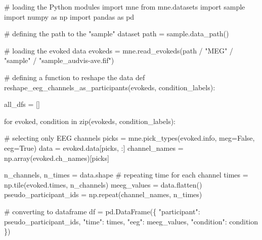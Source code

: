 \documentclass[
  man,
  floatsintext,
  longtable,
  a4paper,
  nolmodern,
  notxfonts,
  notimes,
  colorlinks=true,linkcolor=blue,citecolor=blue,urlcolor=blue]{apa7}
\newenvironment{Shaded}{\begin{snugshade}}{\end{snugshade}}
\newcommand{\BuiltInTok}[1]{\textcolor[rgb]{0.00,0.23,0.31}{#1}}
\newcommand{\CommentTok}[1]{\textcolor[rgb]{0.37,0.37,0.37}{#1}}
\newcommand{\ControlFlowTok}[1]{\textcolor[rgb]{0.00,0.23,0.31}{#1}}
\newcommand{\ImportTok}[1]{\textcolor[rgb]{0.00,0.46,0.62}{#1}}
\newcommand{\KeywordTok}[1]{\textcolor[rgb]{0.00,0.23,0.31}{#1}}
\newcommand{\NormalTok}[1]{\textcolor[rgb]{0.00,0.23,0.31}{#1}}
\newcommand{\OperatorTok}[1]{\textcolor[rgb]{0.37,0.37,0.37}{#1}}
\newcommand{\StringTok}[1]{\textcolor[rgb]{0.13,0.47,0.30}{#1}}
\newcommand{\VariableTok}[1]{\textcolor[rgb]{0.07,0.07,0.07}{#1}}
\begin{document}
\begin{Shaded}
\begin{Highlighting}[]
\CommentTok{\# loading the Python modules}
\ImportTok{import}\NormalTok{ mne}
\ImportTok{from}\NormalTok{ mne.datasets }\ImportTok{import}\NormalTok{ sample}
\ImportTok{import}\NormalTok{ numpy }\ImportTok{as}\NormalTok{ np}
\ImportTok{import}\NormalTok{ pandas }\ImportTok{as}\NormalTok{ pd}

\CommentTok{\# defining the path to the "sample" dataset}
\NormalTok{path }\OperatorTok{=}\NormalTok{ sample.data\_path()}

\CommentTok{\# loading the evoked data}
\NormalTok{evokeds }\OperatorTok{=}\NormalTok{ mne.read\_evokeds(path }\OperatorTok{/} \StringTok{"MEG"} \OperatorTok{/} \StringTok{"sample"} \OperatorTok{/} \StringTok{"sample\_audvis{-}ave.fif"}\NormalTok{)}

\CommentTok{\# defining a function to reshape the data}
\KeywordTok{def}\NormalTok{ reshape\_eeg\_channels\_as\_participants(evokeds, condition\_labels):}
    
\NormalTok{    all\_dfs }\OperatorTok{=}\NormalTok{ []}

    \ControlFlowTok{for}\NormalTok{ evoked, condition }\KeywordTok{in} \BuiltInTok{zip}\NormalTok{(evokeds, condition\_labels):}
        
        \CommentTok{\# selecting only EEG channels}
\NormalTok{        picks }\OperatorTok{=}\NormalTok{ mne.pick\_types(evoked.info, meg}\OperatorTok{=}\VariableTok{False}\NormalTok{, eeg}\OperatorTok{=}\VariableTok{True}\NormalTok{)}
\NormalTok{        data }\OperatorTok{=}\NormalTok{ evoked.data[picks, :]}
\NormalTok{        channel\_names }\OperatorTok{=}\NormalTok{ np.array(evoked.ch\_names)[picks]}

\NormalTok{        n\_channels, n\_times }\OperatorTok{=}\NormalTok{ data.shape}
        \CommentTok{\# repeating time for each channel}
\NormalTok{        times }\OperatorTok{=}\NormalTok{ np.tile(evoked.times, n\_channels)}
\NormalTok{        meeg\_values }\OperatorTok{=}\NormalTok{ data.flatten()}
\NormalTok{        pseudo\_participant\_ids }\OperatorTok{=}\NormalTok{ np.repeat(channel\_names, n\_times)}
        
        \CommentTok{\# converting to dataframe}
\NormalTok{        df }\OperatorTok{=}\NormalTok{ pd.DataFrame(\{}
            \StringTok{"participant"}\NormalTok{: pseudo\_participant\_ids,}
            \StringTok{"time"}\NormalTok{: times,}
            \StringTok{"eeg"}\NormalTok{: meeg\_values,}
            \StringTok{"condition"}\NormalTok{: condition}
\NormalTok{            \})}


\end{Highlighting}
\end{Shaded}
\end{document}
